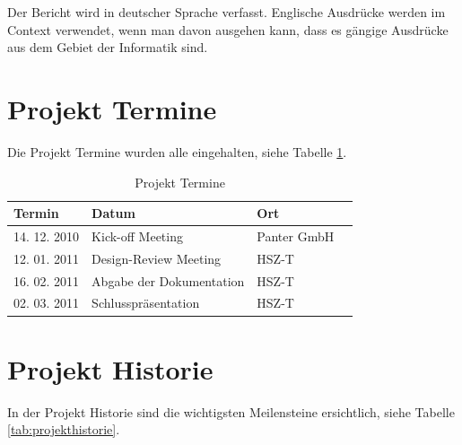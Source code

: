\documentclass[abstracton, listof=totocnumbered,
bibliography=totocnumbered]{scrreprt}
\begin{document}
  Der Bericht wird in deutscher Sprache verfasst. Englische Ausdrücke werden im
  Context verwendet, wenn man davon ausgehen kann, dass es gängige Ausdrücke aus
  dem Gebiet der Informatik sind.
  
  \newpage
  
  \section{Projekt Termine}
  
  Die Projekt Termine wurden alle eingehalten, siehe Tabelle \ref{tab:termine}.
  \newline
  
  \begin{table}[h]
    \begin{center}
      \begin{tabular}{lp{7cm}ll}
        \toprule
        Termin & Datum & Ort \\
        \midrule
        14. 12. 2010 & Kick-off Meeting & Panter GmbH\\
        12. 01. 2011 & Design-Review Meeting & HSZ-T\\
        16. 02. 2011 & Abgabe der Dokumentation & HSZ-T\\
        02. 03. 2011 & Schlusspräsentation & HSZ-T\\
        \bottomrule
      \end{tabular}
      \caption{Projekt Termine}
      \label{tab:termine}
    \end{center}
  \end{table}
  
  \section{Projekt Historie}
  
  In der Projekt Historie sind die wichtigsten Meilensteine ersichtlich, siehe
  Tabelle \ref{tab:projekthistorie}.
  \newline
  
\end{document}
